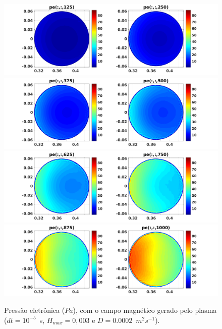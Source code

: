 \documentclass[12pt,oneside,a4paper]{abntex2}
\begin{document}
\begin{figure}[H]
\centering
\includegraphics[scale=0.5]{../SImulacao_breakdown/PDE/petod1B1.png}  
\includegraphics[scale=0.5]{../SImulacao_breakdown/PDE/petod2B1.png} 
\includegraphics[scale=0.5]{../SImulacao_breakdown/PDE/petod3B1.png} 
\includegraphics[scale=0.5]{../SImulacao_breakdown/PDE/petod4B1.png} 
\caption{Pressão eletrônica ($Pa$), com o campo magnético gerado pelo plasma ($dt=10^{-5}$\ s, $H_{max} = 0,003$ e $D=0.0002$\ $m^2s^{-1}$).}
\label{campplasmasi2l3}
\end{figure}
\end{document}
